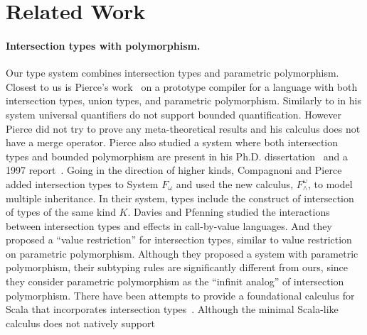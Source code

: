 \section{Related Work} \label{sec:related-work}






\paragraph{Intersection types with polymorphism.}
Our type system combines intersection types and parametric polymorphism. Closest
to us is Pierce's work~\cite{pierce1991programming1} on a prototype
compiler for a language with both intersection types, union types, and
parametric polymorphism. Similarly to \name in his system universal
quantifiers do not support bounded quantification. However Pierce did not try to prove any
meta-theoretical results and his calculus does not have a merge
operator.  Pierce also studied a system where both intersection
types and bounded polymorphism are present in his Ph.D.
dissertation~\cite{pierce1991programming2} and a 1997
report~\cite{pierce1997intersection}. Going in the direction of higher
kinds, Compagnoni and Pierce~\cite{compagnoni1996higher} added
intersection types to System $ F_{\omega} $ and used the new calculus,
$ F^{\omega}_{\wedge} $, to model multiple inheritance. In their
system, types include the construct of intersection of types of the
same kind $ K $. Davies and Pfenning
\cite{davies2000intersection} studied the interactions between
intersection types and effects in call-by-value languages. And they
proposed a ``value restriction'' for intersection types, similar to
value restriction on parametric polymorphism. Although they proposed a system with
parametric polymorphism, their subtyping rules are significantly different from ours,
since they consider parametric polymorphism
as the ``infinit analog'' of intersection polymorphism.
There have been attempts to provide a foundational calculus
for Scala that incorporates intersection
types~\cite{amin2014foundations,amin2012dependent}.
Although the minimal Scala-like calculus does not natively support
